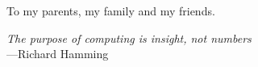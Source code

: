 %
\begin{frontmatter}

%
%
\makefrontmatter 

%
%   
%
%
%
%
\begin{dedication} 
	To my parents, my family and my friends.
\end{dedication}

%   
%



%
%

\begin{epigraph} 
  \emph{The purpose of computing is insight, not numbers}\\
  ---Richard Hamming
\end{epigraph}

%
\tableofcontents

\renewcommand{\glossarysection}[2][]{
\newpage
\noindent
\centerline{LIST OF ABBREVIATIONS}
}


\end{frontmatter}
